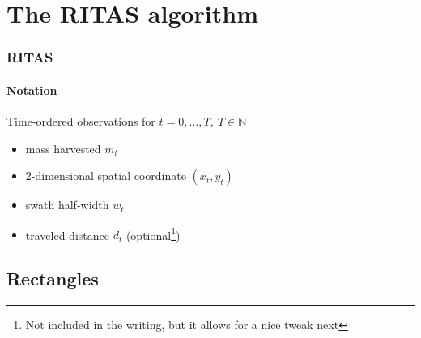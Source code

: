 \documentclass{beamer}
\begin{document}
\section{The RITAS algorithm}

\begin{frame}[t]
  \frametitle{RITAS}
  \framesubtitle{Notation}

  \pause
  Time-ordered observations for $t=0,\ldots,T, \ T \in \mathbb{N}$

  \pause
  \begin{itemize}
  \item<+-> mass harvested $m_t$
  \item<+-> 2-dimensional spatial coordinate $(x_t,y_t)$
  \item<+-> swath half-width $w_t$
  \item<+-> traveled distance $d_t$ (optional\footnote<+->{Not included in
      the writing, but it allows for a nice tweak next})
  \end{itemize}

\end{frame}


\subsection{Rectangles}
\end{document}
